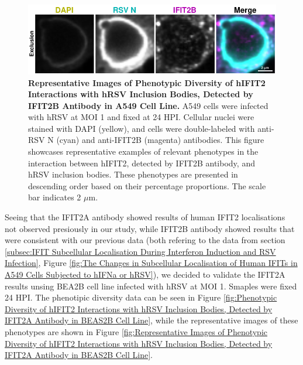 \begin{figure}
    \centering
    \includegraphics[width=1\linewidth]{08. Chapter 3/Figs/02. Infection/02. IFIT2/02. IFIT2B/03. i2b-a549.pdf} 
    \caption[Representative Images of Phenotypic Diversity of hIFIT2 Interactions with hRSV Inclusion Bodies, Detected by IFIT2B Antibody in A549 Cell Line.]{\textbf{Representative Images of Phenotypic Diversity of hIFIT2 Interactions with hRSV Inclusion Bodies, Detected by IFIT2B Antibody in A549 Cell Line.} A549 cells were infected with hRSV at MOI 1 and fixed at 24 HPI. Cellular nuclei were stained with DAPI (yellow), and cells were double-labeled with anti-RSV N (cyan) and anti-IFIT2B (magenta) antibodies. This figure showcases representative examples of relevant phenotypes in the interaction between hIFIT2, detected by IFIT2B antibody, and hRSV inclusion bodies. These phenotypes are presented in descending order based on their percentage proportions. The scale bar indicates 2 \(\mu \mbox{m}\).}
    \label{fig:Representative Images of Phenotypic Diversity of hIFIT2 Interactions with hRSV Inclusion Bodies, Detected by IFIT2B Antibody in A549 Cell Line}
\end{figure}

Seeing that the IFIT2A antibody showed results of human IFIT2 localisations not observed presiously in our study, while IFIT2B antibody showed results that were consistent with our previous data (both refering to the data from section \ref{subsec:IFIT Subcellular Localisation During Interferon Induction and RSV Infection}, Figure \ref{fig:The Changes in Subcellular Localisation of Human IFITs in A549 Cells Subjected to hIFNa or hRSV}), we decided to validate the IFIT2A results unsing BEA2B cell line infected with hRSV at MOI 1. Smaples were fixed 24 HPI. The phenotipic diversity data can be seen in Figure \ref{fig:Phenotypic Diversity of hIFIT2 Interactions with hRSV Inclusion Bodies, Detected by IFIT2A Antibody in BEAS2B Cell Line}, while the representative images of these phenotypes are shown in Figure \ref{fig:Representative Images of Phenotypic Diversity of hIFIT2 Interactions with hRSV Inclusion Bodies, Detected by IFIT2A Antibody in BEAS2B Cell Line}.

